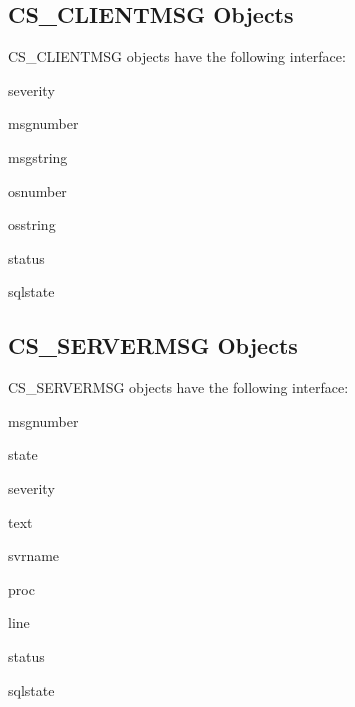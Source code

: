 \subsection{CS_CLIENTMSG Objects}

CS_CLIENTMSG objects have the following interface:

\begin{memberdesc}[CS_CLIENTMSG]{severity}
\end{memberdesc}

\begin{memberdesc}[CS_CLIENTMSG]{msgnumber}
\end{memberdesc}

\begin{memberdesc}[CS_CLIENTMSG]{msgstring}
\end{memberdesc}

\begin{memberdesc}[CS_CLIENTMSG]{osnumber}
\end{memberdesc}

\begin{memberdesc}[CS_CLIENTMSG]{osstring}
\end{memberdesc}

\begin{memberdesc}[CS_CLIENTMSG]{status}
\end{memberdesc}

\begin{memberdesc}[CS_CLIENTMSG]{sqlstate}
\end{memberdesc}

\subsection{CS_SERVERMSG Objects}

CS_SERVERMSG objects have the following interface:

\begin{memberdesc}[CS_SERVERMSG]{msgnumber}
\end{memberdesc}

\begin{memberdesc}[CS_SERVERMSG]{state}
\end{memberdesc}

\begin{memberdesc}[CS_SERVERMSG]{severity}
\end{memberdesc}

\begin{memberdesc}[CS_SERVERMSG]{text}
\end{memberdesc}

\begin{memberdesc}[CS_SERVERMSG]{svrname}
\end{memberdesc}

\begin{memberdesc}[CS_SERVERMSG]{proc}
\end{memberdesc}

\begin{memberdesc}[CS_SERVERMSG]{line}
\end{memberdesc}

\begin{memberdesc}[CS_SERVERMSG]{status}
\end{memberdesc}

\begin{memberdesc}[CS_SERVERMSG]{sqlstate}
\end{memberdesc}
